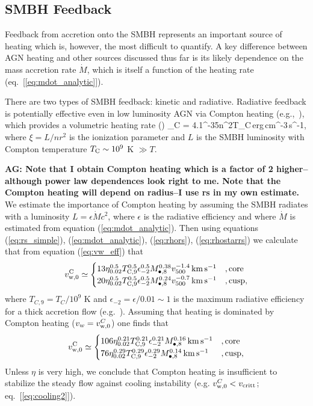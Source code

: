 \documentclass[usenatbib,fleqn]{mn2e}
\begin{document}
\subsection{SMBH Feedback}

Feedback from accretion onto the SMBH represents an important source of heating which is, however, the most difficult to quantify.  A key difference between AGN heating and other sources discussed thus far is its likely dependence on the mass accretion rate $\dot{M}$, which is itself a function of the heating rate (eq.~[\ref{eq:mdot_analytic}]).  

There are two types of SMBH feedback: kinetic and radiative.  Radiative feedback is potentially effective even in low luminosity AGN via Compton heating (e.g.,~\citealt{Gan+14}), which provides a volumetric heating rate (\citealt{Gan+14})
\be
{}_{\rm C} = 4.1^{-35}n^{2}\xi T_{\rm C}\,{\rm erg\,cm^{-3}\,s^{-1}},
\ee
where $\xi = L/n r^{2}$ is the ionization parameter and $L$ is the SMBH luminosity with Compton temperature $T_{\rm C} \sim 10^{9}$ K $\gg T$.  


{\bf AG: Note that I obtain Compton heating which is a factor of 2
  higher--although power law dependences look right to me. Note that
  the Compton heating will depend on radius--I use rs in my own
  estimate. }
We estimate the importance of Compton heating by assuming the SMBH
radiates with a luminosity $L = \epsilon \dot{M}c^{2}$, where
$\epsilon$ is the radiative efficiency and where $\dot{M}$ is
estimated from equation (\ref{eq:mdot_analytic}).  Then using
equations (\ref{eq:rs_simple}), (\ref{eq:mdot_analytic}),
(\ref{eq:rhors}), (\ref{eq:rhostarrs}) we calculate that from equation
(\ref{eq:vw_eff}) that
\begin{align} v_{\rm w,0}^{\rm C} \simeq
  \begin{cases} 13 \eta_{0.02}^{0.5}T_{\rm
C,9}^{0.5}\epsilon_{-2}^{0.5} M_{\bullet,8}^{0.38}v_{500}^{-1.4}\,{\rm
km\,s^{-1}} &, \text{core}\\ 20 \eta_{0.02}^{0.5}T_{\rm
C,9}^{0.5}\epsilon_{-2}^{0.5} M_{\bullet,8}^{0.24}v_{500}^{-0.7}\,{\rm
km\,s^{-1}} &, \text{cusp},
  \end{cases}
  \label{eq:vC}
\end{align} where $T_{C,9} = T_{C}/10^{9}$ K and $\epsilon_{-2} =
\epsilon/0.01 \sim 1$ is the maximum radiative efficiency for a thick
accretion flow (e.g.~\citealt{Narayan&Yi95}).  Assuming that heating
is dominated by Compton heating ($v_{w} = v_{\rm w,0}^{C}$) one finds
that
\begin{align} v_{\rm w,0}^{\rm C} \simeq
  \begin{cases} 106 \eta_{0.02}^{0.21}T_{\rm
C,9}^{0.21}\epsilon_{-2}^{0.21} M_{\bullet,8}^{0.16}\,{\rm km\,s^{-1}}
&, \text{core}\\ 76 \eta_{0.02}^{0.29}T_{\rm
C,9}^{0.29}\epsilon_{-2}^{0.29} M_{\bullet,8}^{0.14}\,{\rm km\,s^{-1}}
&, \text{cusp},
  \end{cases}
  \label{eq:vC2}
\end{align} Unless $\eta$ is very high, we conclude that Compton
heating is insufficient to stabilize the steady flow against cooling
instability (e.g. $v_{\rm w,0}^{C} < v_{\rm critt}$;
eq.~[\ref{eq:cooling2}]).
\end{document}
